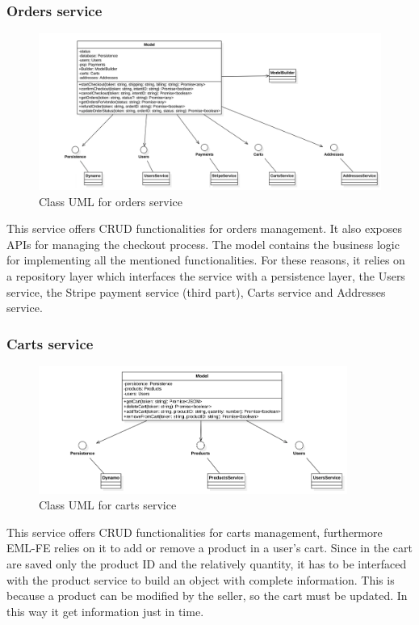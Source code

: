 \subsubsection{Orders service}
\begin{figure}[H]
    \includegraphics[width=\textwidth]{res/images/class-diagrams/orders.png}
    \caption{Class UML for orders service}
\end{figure}
This service offers CRUD functionalities for orders management. It also exposes APIs for managing the checkout process.
The model contains the business logic for implementing all the mentioned functionalities. For these reasons, it relies on a repository layer
which interfaces the service with a persistence layer, the Users service, the Stripe payment service (third part), Carts service and Addresses service.

\subsubsection{Carts service}
\begin{figure}[H]
    \includegraphics[width=0.9\textwidth]{res/images/class-diagrams/carts.png}
    \caption{Class UML for carts service}
\end{figure}
This service offers CRUD functionalities for carts management, furthermore EML-FE relies on it to add or remove a product in a user's cart.
Since in the cart are saved only the product ID and the relatively quantity, it has to be interfaced with the product service to build an object with complete information.
This is because a product can be modified by the seller, so the cart must be updated. In this way it get information just in time.


